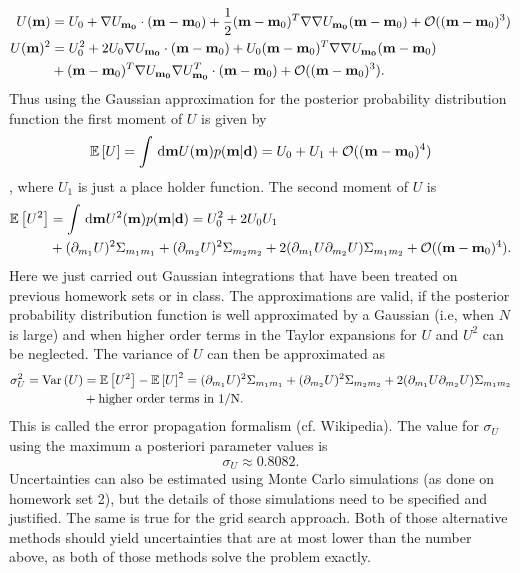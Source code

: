 \documentclass[11pt]{article}
\begin{document}
\begin{subequations}
\begin{align}
U(\mathbf{m}) &= U_0 + \nabla U_{\mathbf{m_0}}\cdot(\mathbf{m}-\mathbf{m}_0) + \frac{1}{2}(\mathbf{m}-\mathbf{m}_0)^T\nabla \nabla U_{\mathbf{m_0}}(\mathbf{m}-\mathbf{m}_0) + \mathcal{O}((\mathbf{m} - \mathbf{m}_0)^3)\\
U(\mathbf{m})^2 &= U_0^2 + 2U_0\nabla U_{\mathbf{m_0}}\cdot(\mathbf{m}-\mathbf{m}_0) + U_0(\mathbf{m}-\mathbf{m}_0)^T\nabla \nabla U_{\mathbf{m_0}}(\mathbf{m}-\mathbf{m}_0)\\
&+ (\mathbf{m}-\mathbf{m}_0)^T\nabla U_{\mathbf{m_0}}\nabla U_{\mathbf{m_0}}^T\cdot(\mathbf{m}-\mathbf{m}_0)+ \mathcal{O}((\mathbf{m} - \mathbf{m}_0)^3).
\end{align}
\end{subequations}
Thus using the Gaussian approximation for the posterior probability distribution function the first moment of $U$ is given by
\begin{equation}
\mathbb{E}\left[U\right] = \int \, \text{d}\mathbf{m} U(\mathbf{m}) p(\mathbf{m}|\mathbf{d}) = U_0 + U_1 + \mathcal{O}((\mathbf{m} - \mathbf{m}_0)^4)
\end{equation}, 
where $U_1$ is just a place holder function. The second moment of $U$ is
\begin{subequations}
\begin{align}
\mathbb{E}\left[U^2\right] &= \int \, \text{d}\mathbf{m} U^2(\mathbf{m}) p(\mathbf{m}|\mathbf{d}) = U_0^2 + 2U_0U_1\\ 
&+ (\partial_{m_1}U)^2\Sigma_{m_1m_1}+ (\partial_{m_2}U)^2\Sigma_{m_2m_2}+ 2(\partial_{m_1}U\partial_{m_2}U)\Sigma_{m_1m_2} + \mathcal{O}((\mathbf{m} - \mathbf{m}_0)^4).
\end{align}
\end{subequations} 
Here we just carried out Gaussian integrations that have been treated on previous homework sets or in class. The approximations are valid, if the posterior probability distribution function is well approximated by a Gaussian (i.e, when $N$ is large) and when higher order terms in the Taylor expansions for $U$ and $U^2$ can be neglected. The variance of $U$ can then be approximated as
\begin{subequations}
\begin{align}
\sigma_U^2 = \text{Var}\left(U\right) &= \mathbb{E}\left[U^2\right] - \mathbb{E}\left[U\right]^2 = (\partial_{m_1}U)^2\Sigma_{m_1m_1} + (\partial_{m_2}U)^2\Sigma_{m_2m_2}+ 2(\partial_{m_1}U\partial_{m_2}U)\Sigma_{m_1m_2}\\
&+ \text{higher order terms in 1/N}.
\end{align}
\end{subequations}
This is called the error propagation formalism (cf. Wikipedia). The value for $\sigma_U$ using the maximum a posteriori parameter values is
\begin{equation}
\sigma_U \approx 0.8082.
\end{equation}
Uncertainties can also be estimated using Monte Carlo simulations (as done on homework set 2), but the details of those simulations need to be specified and justified. The same is true for the grid search approach. Both of those alternative methods should yield uncertainties that are at most lower than the number above, as both of those methods solve the problem exactly.
\end{document}
